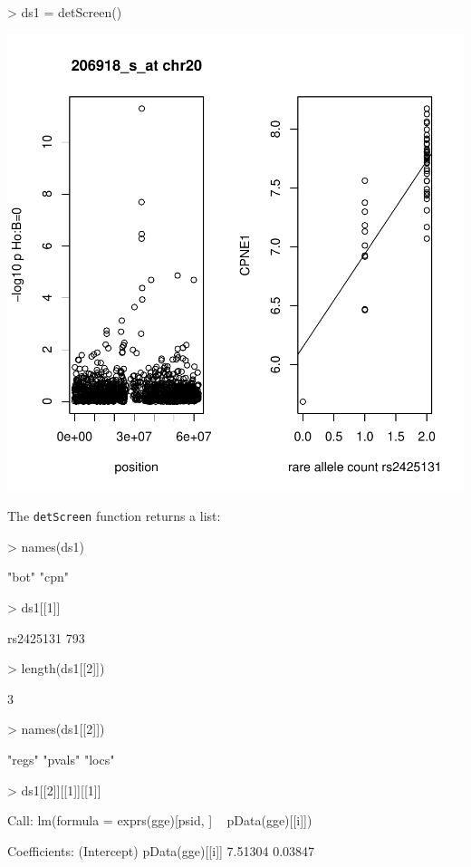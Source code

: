 \documentclass[12pt]{article}
\newcommand{\Rfunction}[1]{{\texttt{#1}}}
\begin{document}
\begin{center}
\begin{Schunk}
\begin{Sinput}
> ds1 = detScreen()
\end{Sinput}
\end{Schunk}
\includegraphics{GGOverview-dosc}
\end{center}

The \Rfunction{detScreen} function returns a list:
\begin{Schunk}
\begin{Sinput}
> names(ds1)
\end{Sinput}
\begin{Soutput}
[1] "bot" "cpn"
\end{Soutput}
\begin{Sinput}
> ds1[[1]]
\end{Sinput}
\begin{Soutput}
rs2425131 
      793 
\end{Soutput}
\begin{Sinput}
> length(ds1[[2]])
\end{Sinput}
\begin{Soutput}
[1] 3
\end{Soutput}
\begin{Sinput}
> names(ds1[[2]])
\end{Sinput}
\begin{Soutput}
[1] "regs"  "pvals" "locs" 
\end{Soutput}
\begin{Sinput}
> ds1[[2]][[1]][[1]]
\end{Sinput}
\begin{Soutput}
Call:
lm(formula = exprs(gge)[psid, ] ~ pData(gge)[[i]])

Coefficients:
    (Intercept)  pData(gge)[[i]]  
        7.51304          0.03847  
\end{Soutput}
\end{Schunk}
\end{document}
